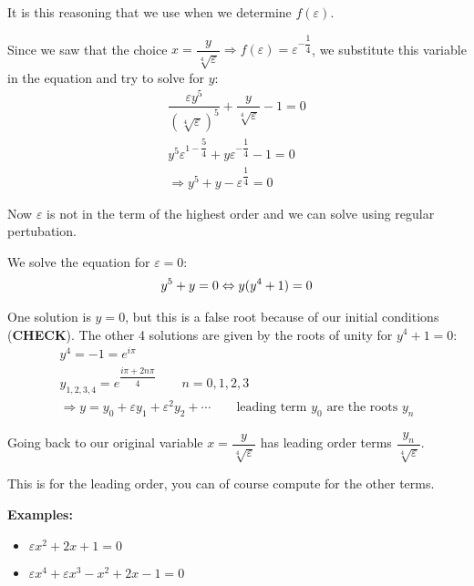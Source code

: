 \noindent It is this reasoning that we use when we determine $f(\varepsilon)$.\par
\noindent Since we saw that the choice $x = \dfrac{y}{\sqrt[4]{\varepsilon}}\Rightarrow f(\varepsilon) = \varepsilon^{-\dfrac{1}{4}}$, we substitute this variable in the equation and try to solve for $y$:
\begin{equation*}
  \begin{gathered}
    \dfrac{\varepsilon y^5}{(\sqrt[4]{\varepsilon})^5}+\dfrac{y}{\sqrt[4]{\varepsilon}} - 1=0\\
    y^5\varepsilon^{1-\dfrac{5}{4}}+y\varepsilon^{-\dfrac{1}{4}}-1=0\\
    \Rightarrow y^5 +y-\varepsilon^{\dfrac{1}{4}} = 0
  \end{gathered}
\end{equation*}
\par\bigskip
\noindent Now $\varepsilon$ is not in the term of the highest order and we can solve using regular pertubation.\par
\noindent We solve the equation for $\varepsilon=0$:
\begin{equation*}
  \begin{gathered}
    y^5+y=0\Leftrightarrow y(y^4+1) = 0
  \end{gathered}
\end{equation*}\par
\noindent One solution is $y=0$, but this is a false root because of our initial conditions (\textbf{CHECK}). The other 4 solutions are given by the roots of unity for $y^4+1=0$:
\begin{equation*}
  \begin{gathered}
    y^4 = -1 = e^{i\pi}\\
    y_{1,2,3,4} = e^{\dfrac{i\pi+2n\pi}{4}}\qquad n = 0,1,2,3\\
    \Rightarrow y = y_0+\varepsilon y_1+\varepsilon^2 y_2+\cdots\qquad\text{leading term $y_0$ are the roots } y_n
  \end{gathered}
\end{equation*}
\par\bigskip
\noindent Going back to our original variable $x = \dfrac{y}{\sqrt[4]{\varepsilon}}$ has leading order terms $\dfrac{y_n}{\sqrt[4]{\varepsilon}}$.
\par\bigskip
\noindent This is for the leading order, you can of course compute for the other terms.
\par\bigskip
\noindent\textbf{Examples:}\par
\begin{itemize}
  \item $\varepsilon x^2+2x+1=0$
  \item $\varepsilon x^4+\varepsilon x^3-x^2+2x-1=0$
\end{itemize}\par
